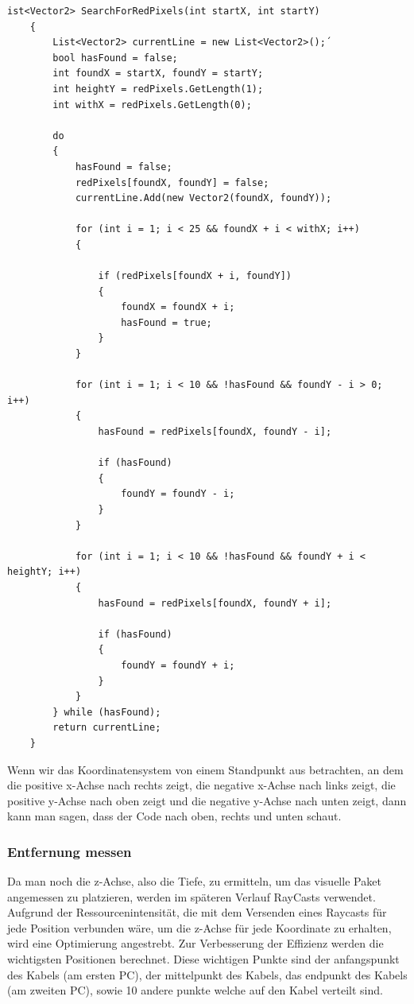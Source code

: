 \begin{lstlisting}[style=csharp, caption={Kabel suche}, label=code:SearchForRedPixels]
ist<Vector2> SearchForRedPixels(int startX, int startY)
    {
        List<Vector2> currentLine = new List<Vector2>();´
        bool hasFound = false;
        int foundX = startX, foundY = startY;
        int heightY = redPixels.GetLength(1);
        int withX = redPixels.GetLength(0);

        do
        {
            hasFound = false;
            redPixels[foundX, foundY] = false;
            currentLine.Add(new Vector2(foundX, foundY));

            for (int i = 1; i < 25 && foundX + i < withX; i++)
            {

                if (redPixels[foundX + i, foundY])
                {
                    foundX = foundX + i;
                    hasFound = true;
                }
            }

            for (int i = 1; i < 10 && !hasFound && foundY - i > 0; i++)
            {
                hasFound = redPixels[foundX, foundY - i];

                if (hasFound)
                {
                    foundY = foundY - i;
                }
            }

            for (int i = 1; i < 10 && !hasFound && foundY + i < heightY; i++)
            {
                hasFound = redPixels[foundX, foundY + i];

                if (hasFound)
                {
                    foundY = foundY + i;
                }
            }
        } while (hasFound);
        return currentLine;
    }
\end{lstlisting}
Wenn wir das Koordinatensystem von einem Standpunkt aus betrachten, an dem die positive x-Achse nach rechts zeigt, die
negative x-Achse nach links zeigt, die positive y-Achse nach oben zeigt und die negative y-Achse nach unten zeigt, dann
kann man sagen, dass der Code nach oben, rechts und unten schaut.

\subsubsection{Entfernung messen}
Da man noch die z-Achse, also die Tiefe, zu ermitteln, um das visuelle Paket angemessen zu platzieren, werden
im späteren Verlauf RayCasts verwendet. Aufgrund der Ressourcenintensität, die mit dem Versenden eines Raycasts
für jede Position verbunden wäre, um die z-Achse für jede Koordinate zu erhalten, wird eine Optimierung angestrebt.
Zur Verbesserung der Effizienz werden die wichtigsten Positionen berechnet. Diese wichtigen Punkte sind der
anfangspunkt des Kabels (am ersten PC), der mittelpunkt des Kabels, das endpunkt des Kabels (am zweiten PC), sowie 10
andere punkte welche auf den Kabel verteilt sind.

